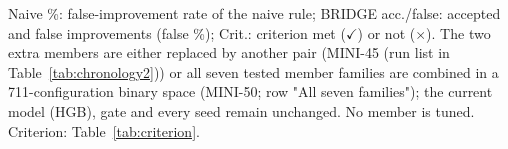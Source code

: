 \begin{table}[!htb]
\vspace{2pt}
\parbox{\linewidth}{\justifying\scriptsize *Naive \%: false-improvement rate of the naive rule; BRIDGE acc./false: accepted and false improvements (false \%); Crit.: criterion met ($\checkmark$) or not ($\times$). The two extra members are either replaced by another pair (MINI-45 (run list in Table~\ref{tab:chronology2})) or all seven tested member families are combined in a 711-configuration binary space (MINI-50; row "All seven families"); the current model (HGB), gate and every seed remain unchanged. No member is tuned. Criterion: Table~\ref{tab:criterion}.}
\end{table}
